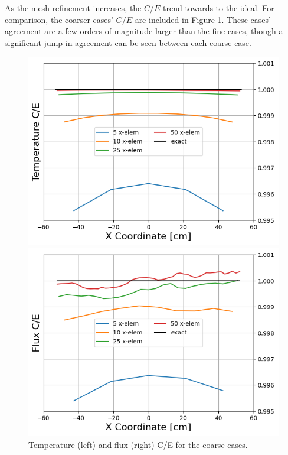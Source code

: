 \documentclass[letterpaper]{mc2023}
\begin{document}
As the mesh refinement increases, the $C/E$ trend towards to the ideal. For comparison, the coarser cases' $C/E$ are included in
Figure \ref{fig:coarse_ce}. These cases' agreement are a few orders of magnitude larger than the fine cases, though a significant jump
in agreement can be seen between each coarse case.
\begin{figure}[H]
    \centering
    \begin{minipage}[b]{0.49\linewidth}
        \includegraphics[width=\linewidth]{figures/coarse_temp_num_to_analy_ratios.png}
    \end{minipage}
    \begin{minipage}[b]{0.49\linewidth}
        \includegraphics[width=\linewidth]{figures/coarse_flux_num_to_analy_ratios.png}
    \end{minipage}
    \caption{Temperature (left) and flux (right) C/E for the coarse cases.}
    \label{fig:coarse_ce}
\end{figure}
\end{document}
